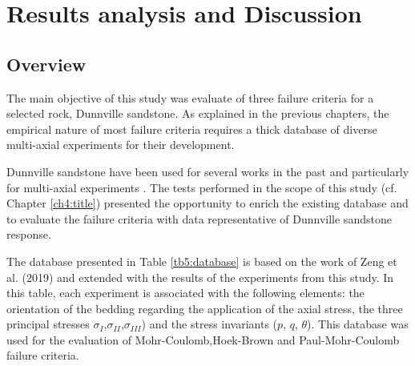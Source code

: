 \chapter{Results analysis and Discussion}\label{ch5:chapter5}


\section{Overview}\label{ch5:database}

The main objective of this study was evaluate of three failure criteria for a selected rock, Dunnville sandstone. As explained in the previous chapters, the empirical nature of most failure criteria requires a thick database of diverse multi-axial experiments for their development. 

Dunnville sandstone have been used for several works in the past and particularly for multi-axial experiments \cite{Labuz2018}\cite{Zeng2019}\cite{Tarokh2016}. The tests performed in the scope of this study (cf. Chapter \ref{ch4:title}) presented the opportunity to enrich the existing database and to evaluate the failure criteria with data representative of Dunnville sandstone response.

The database presented in Table \ref{tb5:database} is based on the work of Zeng et al. (2019) \cite{Zeng2019} and extended with the results of the experiments from this study. In this table, each experiment is associated with the following elements: the orientation of the bedding regarding the application of the axial stress, the three principal stresses  $\sigma_I$,$\sigma_{II}$,$\sigma_{III}$) and the stress invariants ($p$, $q$, $\theta$). This database was used for the evaluation of Mohr-Coulomb,Hoek-Brown and Paul-Mohr-Coulomb failure criteria.

